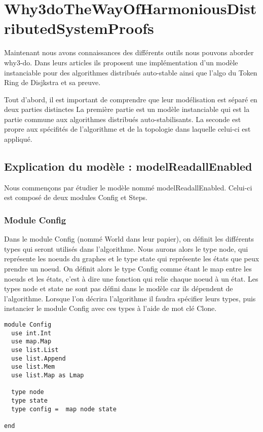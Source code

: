 \documentclass[11pt]{article}
\begin{document}
\section{Why3doTheWayOfHarmoniousDistributedSystemProofs}
\label{sec:org47e21e2}

Maintenant nous avons connaissances des différents outils nous pouvons aborder why3-do.
Dans leurs articles ils proposent une implémentation d'un modèle instanciable pour des algorithmes
distribués auto-stable ainsi que l'algo du Token Ring de Disjkstra et sa preuve.


Tout d'abord, il est important de comprendre que leur modélisation est séparé en deux parties distinctes
La première partie est un modèle instanciable qui est la partie commune aux algorithmes distribués
auto-stabilisants. 
La seconde est propre aux spécifités de l'algorithme et de la topologie dans laquelle celui-ci est appliqué.

\subsection{Explication du modèle : modelReadallEnabled}
\label{sec:org002cd01}

Nous commençons par étudier le modèle nommé modelReadallEnabled.
Celui-ci est composé de deux modules Config et Steps.


\subsubsection{Module Config}
\label{sec:org1b2d891}

Dans le module Config (nommé World dans leur papier), on définit les différents types qui seront utilisés dans l'algorithme.
Nous aurons alors le type node, qui représente les noeuds du graphes et le type state qui représente les états que peux prendre un noeud.
On définit alors le type Config comme étant le map entre les noeuds et les états, c'est à dire une fonction qui relie chaque noeud à un état.
Les types node et state ne sont pas défini dans le modèle car ils dépendent de l'algorithme. 
Lorsque l'on décrira l'algorithme il faudra spécifier leurs types, puis instancier le module Config avec ces types à l'aide de mot clé Clone. 

\lstset{language=why3,label= ,caption= ,captionpos=b,numbers=none}
\begin{lstlisting}
module Config
  use int.Int
  use map.Map
  use list.List
  use list.Append
  use list.Mem
  use list.Map as Lmap

  type node
  type state
  type config =  map node state

end

\end{lstlisting}
\end{document}
